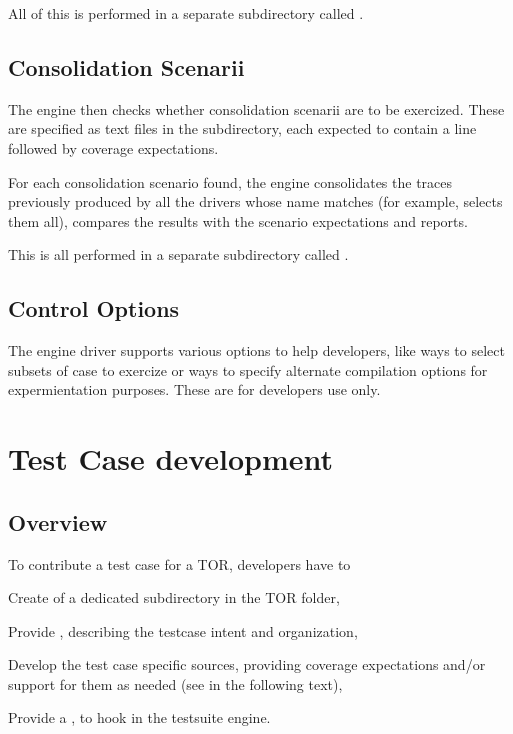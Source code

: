 \documentclass {report}
\begin{document}
All of this is performed in a separate subdirectory called .

\subsection{Consolidation Scenarii}

The engine then checks whether consolidation scenarii are to be exercized.
%
These are specified as  text files in the 
subdirectory, each expected to contain a  line followed by
coverage expectations.

For each consolidation scenario found, the engine consolidates the traces
previously produced by all the drivers whose name matches  (for
example,   selects them all), compares the results with the scenario
expectations and reports.

This is all performed in a separate subdirectory called
 .

\subsection{Control Options}

The engine driver supports various options to help developers, like
ways to select subsets of case to exercize or ways to specify alternate
compilation options for expermientation purposes.
%
These are for \xcov{} developers use only.

\section{Test Case development}
\label{sec:tc-dev}

\subsection{Overview}

To contribute a test case for a TOR, developers have to

\begin{Itemize}
\item%
  Create of a dedicated subdirectory in the TOR folder,
%
\item%
  Provide , describing the testcase intent and organization,
%
\item%
  Develop the test case specific sources, providing coverage expectations
  and/or support for them as needed (see in the following text),
%
\item%
  Provide a , to hook in the testsuite engine.
%
\end{Itemize}
\end{document}
